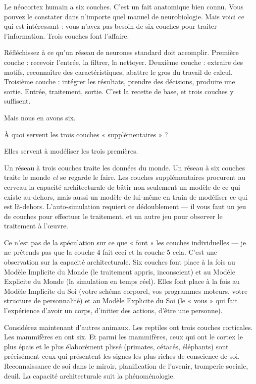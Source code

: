 \documentclass[11pt, twoside, openright]{book}
\begin{document}
Le néocortex humain a six couches. C'est un fait anatomique bien connu. Vous pouvez le constater dans n'importe quel manuel de neurobiologie. Mais voici ce qui est intéressant : vous n'avez pas besoin de six couches pour traiter l'information. Trois couches font l'affaire.

Réfléchissez à ce qu'un réseau de neurones standard doit accomplir. Première couche : recevoir l'entrée, la filtrer, la nettoyer. Deuxième couche : extraire des motifs, reconnaître des caractéristiques, abattre le gros du travail de calcul. Troisième couche : intégrer les résultats, prendre des décisions, produire une sortie. Entrée, traitement, sortie. C'est la recette de base, et trois couches y suffisent.

Mais nous en avons six.

À quoi servent les trois couches « supplémentaires » ?

Elles servent à modéliser les trois premières.

Un réseau à trois couches traite les données du monde. Un réseau à six couches traite le monde \textit{et} se regarde le faire. Les couches supplémentaires procurent au cerveau la capacité architecturale de bâtir non seulement un modèle de ce qui existe au-dehors, mais aussi un modèle de lui-même en train de modéliser ce qui est là-dehors. L'auto-simulation requiert ce dédoublement --- il vous faut un jeu de couches pour effectuer le traitement, et un autre jeu pour observer le traitement à l'œuvre.

Ce n'est pas de la spéculation sur ce que « font » les couches individuelles --- je ne prétends pas que la couche 4 fait ceci et la couche 5 cela. C'est une observation sur la capacité architecturale. Six couches font place à la fois au Modèle Implicite du Monde (le traitement appris, inconscient) et au Modèle Explicite du Monde (la simulation en temps réel). Elles font place à la fois au Modèle Implicite du Soi (votre schéma corporel, vos programmes moteurs, votre structure de personnalité) et au Modèle Explicite du Soi (le « vous » qui fait l'expérience d'avoir un corps, d'initier des actions, d'être une personne).

Considérez maintenant d'autres animaux. Les reptiles ont trois couches corticales. Les mammifères en ont six. Et parmi les mammifères, ceux qui ont le cortex le plus épais et le plus élaborément plissé (primates, cétacés, éléphants) sont précisément ceux qui présentent les signes les plus riches de conscience de soi. Reconnaissance de soi dans le miroir, planification de l'avenir, tromperie sociale, deuil. La capacité architecturale suit la phénoménologie.
\end{document}
